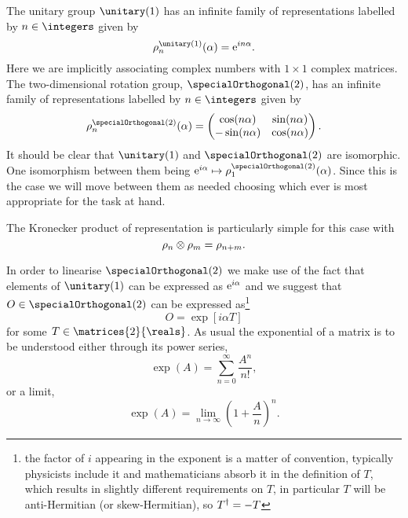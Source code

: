 The unitary group \(\unitary(1)\) has an infinite family of representations labelled by \(n \in \integers\) given by
\begin{equation}
    \rho_n^{\unitary(1)}(\alpha) = \e^{in\alpha}.
\end{equation}
Here we are implicitly associating complex numbers with \(1\times 1\) complex matrices.
The two-dimensional rotation group, \(\specialOrthogonal(2)\), has an infinite family of representations labelled by \(n \in \integers\) given by
\begin{equation}
    \rho_n^{\specialOrthogonal(2)}(\alpha) =
    \begin{pmatrix}
        \cos(n\alpha) & \sin(n\alpha)\\
        -\sin(n\alpha) & \cos(n\alpha)
    \end{pmatrix}
    .
\end{equation}
It should be clear that \(\unitary(1)\) and \(\specialOrthogonal(2)\) are isomorphic.
One isomorphism between them being \(\e^{i\alpha} \mapsto \rho_{1}^{\specialOrthogonal(2)}(\alpha)\).
Since this is the case we will move between them as needed choosing which ever is most appropriate for the task at hand.

The Kronecker product of representation is particularly simple for this case with
\begin{equation}
    \rho_{n} \otimes \rho_{m} = \rho_{n + m}.
\end{equation}

In order to linearise \(\specialOrthogonal(2)\) we make use of the fact that elements of \(\unitary(1)\) can be expressed as \(\mathrm{e}^{i\alpha}\) and we suggest that \(O \in \specialOrthogonal(2)\) can be expressed as\footnote{the factor of \(i\) appearing in the exponent is a matter of convention, typically physicists include it and mathematicians absorb it in the definition of \(T\), which results in slightly different requirements on \(T\), in particular \(T\) will be anti-Hermitian (or skew-Hermitian), so \(T^\dagger = -T\)}
\begin{equation}
    O = \exp[i\alpha T]
\end{equation}
for some \(T \in \matrices{2}{\reals}\).
As usual the exponential of a matrix is to be understood either through its power series,
\begin{equation}
    \exp(A) = \sum_{n = 0}^{\infty} \frac{A^n}{n!},
\end{equation}
or a limit,
\begin{equation}
    \exp(A) = \lim_{n \to \infty} \left( 1 + \frac{A}{n} \right)^{n}.
\end{equation}

